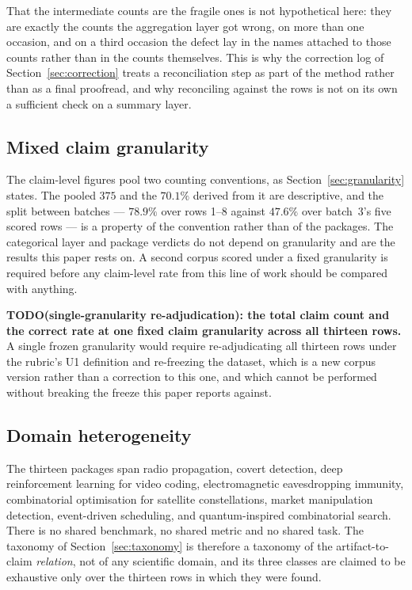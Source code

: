 \documentclass[sigconf,review]{acmart}
\begin{document}
That the intermediate counts are the fragile ones is not hypothetical here:
they are exactly the counts the aggregation layer got wrong, on more than one
occasion, and on a third occasion the defect lay in the names attached to
those counts rather than in the counts themselves. This is why the correction
log of Section~\ref{sec:correction} treats a reconciliation step as part of
the method rather than as a final proofread, and why reconciling against the
rows is not on its own a sufficient check on a summary layer.

\subsection{Mixed claim granularity}
\label{sec:threat-gran}

The claim-level figures pool two counting conventions, as
Section~\ref{sec:granularity} states. The pooled $375$ and the $70.1\%$ derived
from it are descriptive, and the split between batches --- $78.9\%$ over rows
1--8 against $47.6\%$ over batch~3's five scored rows --- is a property of the
convention rather than of the packages. The
categorical layer and package verdicts do not depend on granularity and are
the results this paper rests on. A second corpus scored under a fixed
granularity is required before any claim-level rate from this line of work
should be compared with anything.

\textbf{TODO(single-granularity re-adjudication): the total claim count and
the correct rate at one fixed claim granularity across all thirteen rows.} A
single frozen granularity would require re-adjudicating all thirteen rows
under the rubric's U1 definition and re-freezing the dataset, which is a new
corpus version rather than a correction to this one, and which cannot be
performed without breaking the freeze this paper reports against.

\subsection{Domain heterogeneity}
\label{sec:threat-domain}

The thirteen packages span radio propagation, covert detection, deep
reinforcement learning for video coding, electromagnetic eavesdropping
immunity, combinatorial optimisation for satellite constellations, market
manipulation detection, event-driven scheduling, and quantum-inspired
combinatorial search. There is no shared benchmark, no shared metric and no
shared task. The taxonomy of Section~\ref{sec:taxonomy} is therefore a
taxonomy of the artifact-to-claim \emph{relation}, not of any scientific
domain, and its three classes are claimed to be exhaustive only over the
thirteen rows in which they were found.
\end{document}
